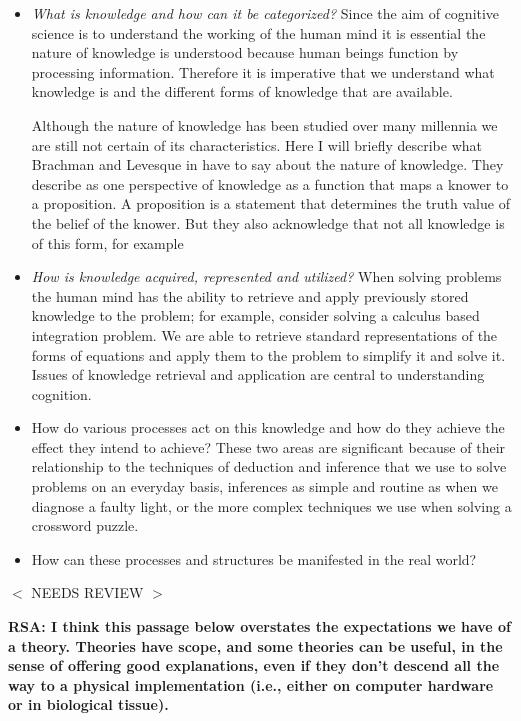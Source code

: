 \begin{itemize}
\item \emph{What is knowledge and how can it be categorized?}  Since the aim
  of cognitive science is to understand the working of the human mind
  it is essential the nature of knowledge is understood because human
  beings function by processing information. Therefore it is
  imperative that we understand what knowledge is and the different
  forms of knowledge that are available.

  Although the nature of knowledge has been studied over many
  millennia we are still not certain of its characteristics. Here I
  will briefly describe what Brachman and Levesque in
  \cite{brachman-levesque:2004a} have to say about the nature of knowledge.
  They describe as one perspective of knowledge as a function that
  maps a knower to a proposition. A proposition is a statement that
  determines the truth value of the belief of the knower. But they
  also acknowledge that not all knowledge is of this form, for example

\item \emph{How is knowledge acquired, represented and utilized?} When
  solving problems the human mind has the ability to retrieve and
  apply previously stored knowledge to the problem; for example,
  consider solving a calculus based integration problem.  We are able
  to retrieve standard representations of the forms of equations and
  apply them to the problem to simplify it and solve it.   Issues
    of knowledge retrieval and application are central to
  understanding cognition.

\item How do various processes act on this knowledge and how do they
  achieve the effect they intend to achieve?  These two areas are
  significant because of their relationship to the techniques of
  deduction and inference that we use to solve problems on an everyday
  basis, inferences as simple and routine as when we diagnose a faulty
  light, or the more complex techniques we use when solving a
  crossword puzzle.

\item How can these processes and structures be manifested in the real
  world?
\end{itemize}



$<$ NEEDS REVIEW $>$

{\bf RSA: I think this passage below overstates the expectations we have of
  a theory.  Theories have scope, and some theories can be useful, in
  the sense of offering good explanations, even if they don't descend
  all the way to a physical implementation (i.e., either on computer
  hardware or in biological tissue).}

